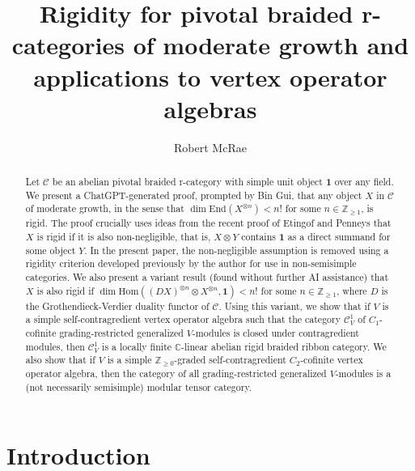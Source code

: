 \documentclass[11pt, reqno]{amsart}
\title[Rigidity for braided r-categories]{Rigidity for pivotal braided r-categories of moderate growth and applications to vertex operator algebras}
\author{Robert McRae}
\date{}
\theoremstyle{definition}\newtheorem{defi}[thm]{Definition}
\theoremstyle{definition}\newtheorem{rem}[thm]{Remark}
\theoremstyle{definition}\newtheorem{exam}[thm]{Example}
\theoremstyle{definition}\newtheorem{assum}[thm]{Assumption}
\newcommand{\CC}{\mathbb{C}}
\newcommand{\vac}{\mathbf{1}}
\begin{document}



 \begin{abstract}
Let $\mathcal{C}$ be an abelian pivotal braided r-category with simple unit object $\mathbf{1}$ over any field.  We present a ChatGPT-generated proof, prompted by Bin Gui, that any object $X$ in $\mathcal{C}$ of moderate growth, in the sense that $\dim\mathrm{End}(X^{\otimes n})<n!$ for some $n\in\mathbb{Z}_{\geq 1}$, is rigid. The proof crucially uses ideas from the recent proof of Etingof and Penneys that $X$ is rigid if it is also non-negligible, that is, $X\otimes Y$ contains $\mathbf{1}$ as a direct summand for some object $Y$. In the present paper, the non-negligible assumption is removed using a rigidity criterion developed previously by the author for use in non-semisimple categories. We also present a variant result (found without further AI assistance) that $X$ is also rigid if $\dim\mathrm{Hom}((DX)^{\otimes n}\otimes X^{\otimes n},\vac)<n!$ for some $n\in\mathbb{Z}_{\geq 1}$, where $D$ is the Grothendieck-Verdier duality functor of $\mathcal{C}$. Using this variant, we show that if $V$ is a simple self-contragredient vertex operator algebra such that the category $\mathcal{C}^1_V$ of $C_1$-cofinite grading-restricted generalized $V$-modules is closed under contragredient modules, then $\mathcal{C}^1_V$ is a locally finite $\CC$-linear abelian rigid braided ribbon category. We also show that if $V$ is a simple $\mathbb{Z}_{\geq 0}$-graded self-contragredient $C_2$-cofinite vertex operator algebra, then the category of all grading-restricted generalized $V$-modules is a (not necessarily semisimple) modular tensor category.
 \end{abstract}

\maketitle

\tableofcontents

\section{Introduction}
\end{document}
